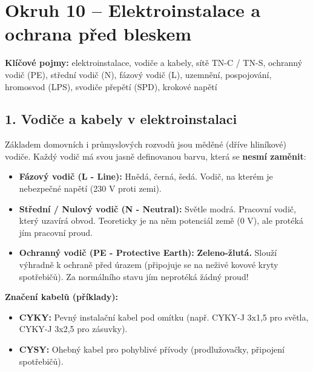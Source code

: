 \documentclass[a4paper,10pt]{article}
\begin{document}
\section*{\large Okruh 10 – Elektroinstalace a ochrana před bleskem}

\begin{pojmybox}
\textbf{Klíčové pojmy:}
elektroinstalace, vodiče a kabely, sítě TN-C / TN-S, ochranný vodič (PE), střední vodič (N), fázový vodič (L), uzemnění, pospojování, hromosvod (LPS), svodiče přepětí (SPD), krokové napětí
\end{pojmybox}

\begin{vysvetlenibox}

\subsection*{1. Vodiče a kabely v elektroinstalaci}

Základem domovních i průmyslových rozvodů jsou měděné (dříve hliníkové) vodiče. Každý vodič má svou jasně definovanou barvu, která se \textbf{nesmí zaměnit}:

\begin{itemize}
    \item \textbf{Fázový vodič (L - Line):} Hnědá, černá, šedá. Vodič, na kterém je nebezpečné napětí (230 V proti zemi).
    \item \textbf{Střední / Nulový vodič (N - Neutral):} Světle modrá. Pracovní vodič, který uzavírá obvod. Teoreticky je na něm potenciál země (0 V), ale protéká jím pracovní proud.
    \item \textbf{Ochranný vodič (PE - Protective Earth):} \textbf{Zeleno-žlutá.} Slouží výhradně k ochraně před úrazem (připojuje se na neživé kovové kryty spotřebičů). Za normálního stavu jím neprotéká žádný proud!
\end{itemize}

\textbf{Značení kabelů (příklady):}
\begin{itemize}
    \item \textbf{CYKY:} Pevný instalační kabel pod omítku (např. CYKY-J 3x1,5 pro světla, CYKY-J 3x2,5 pro zásuvky).
    \item \textbf{CYSY:} Ohebný kabel pro pohyblivé přívody (prodlužovačky, připojení spotřebičů).
\end{itemize}


\end{vysvetlenibox}
\end{document}
